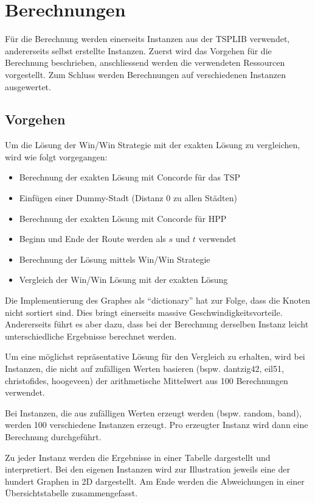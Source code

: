 \documentclass[11pt,a4paper]{article}
\begin{document}
\section{Berechnungen}
Für die Berechnung werden einerseits Instanzen aus der TSPLIB verwendet, andererseits selbst erstellte Instanzen.
Zuerst wird das Vorgehen für die Berechnung beschrieben, anschliessend werden die verwendeten Ressourcen vorgestellt. Zum Schluss werden Berechnungen auf verschiedenen Instanzen ausgewertet.

\subsection{Vorgehen}
Um die Lösung der Win/Win Strategie mit der exakten Lösung zu vergleichen, wird wie folgt vorgegangen:

\begin{itemize}
    \item Berechnung der exakten Lösung mit Concorde für das TSP 
    \item Einfügen einer Dummy-Stadt (Distanz 0 zu allen Städten)
    \item Berechnung der exakten Lösung mit Concorde für HPP 
    \item Beginn und Ende der Route werden als $s$ und $t$ verwendet
    \item Berechnung der Lösung mittels Win/Win Strategie
    \item Vergleich der Win/Win Lösung mit der exakten Lösung
\end{itemize}

Die Implementierung des Graphes als "`dictionary"' hat zur Folge, dass die Knoten nicht sortiert sind. Dies bringt einerseits massive Geschwindigkeitsvorteile. Andererseits führt es aber dazu, dass bei der Berechnung derselben Instanz leicht unterschiedliche Ergebnisse berechnet werden.

Um eine möglichst repräsentative Lösung für den Vergleich zu erhalten, wird bei Instanzen, die nicht auf zufälligen Werten basieren (bspw. dantzig42, eil51, christofides, hoogeveen) der arithmetische Mittelwert aus 100 Berechnungen verwendet.

Bei Instanzen, die aus zufälligen Werten erzeugt werden (bspw. random, band), werden 100 verschiedene Instanzen erzeugt. Pro erzeugter Instanz wird dann eine Berechnung durchgeführt.

Zu jeder Instanz werden die Ergebnisse in einer Tabelle dargestellt und interpretiert. Bei den eigenen Instanzen wird zur Illustration jeweils eine der hundert Graphen in 2D dargestellt. Am Ende werden die Abweichungen in einer Übersichtstabelle zusammengefasst.
\end{document}
